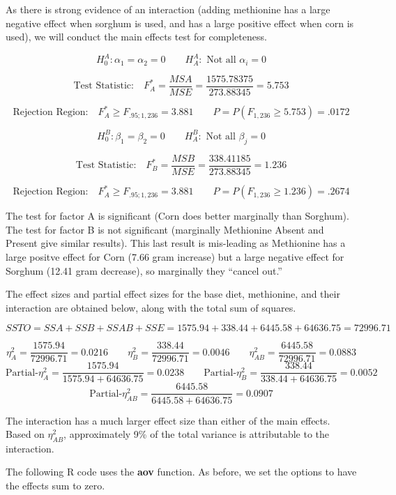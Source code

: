 \documentclass[
]{book}
\begin{document}
As there is strong evidence of an interaction (adding methionine has a
large negative effect when sorghum is used, and has a large positive
effect when corn is used), we will conduct the main effects test for
completeness.

\[
H_0^A: \alpha_1 =  \alpha_2=0 \qquad
H_A^A: \mbox { Not all } \alpha_i=0
\]

\[
\mbox{Test Statistic:} \quad F_{A}^*=
\frac{MSA}{MSE}=\frac{1575.78375}{273.88345}=5.753
\]

\[
\mbox{Rejection Region:} \quad F_{A}^* \ge F_{.95;1,236}=3.881
\qquad P=P\left(F_{1,236}\ge 5.753\right)=.0172
\]

\[
H_0^B: \beta_1 = \beta_2=0 \qquad
H_A^B: \mbox { Not all } \beta_j=0
\]

\[
\mbox{Test Statistic:} \quad F_{B}^*=\frac{MSB}{MSE}=\frac{338.41185}{273.88345}
=1.236
\]

\[
\mbox{Rejection Region:} \quad F_{A}^* \ge F_{.95;1,236}=3.881
\qquad P=P\left(F_{1,236}\ge 1.236\right)=.2674
\]

The test for factor A is significant (Corn does better marginally than
Sorghum). The test for factor B is not significant (marginally
Methionine Absent and Present give similar results). This last result is
mis-leading as Methionine has a large positve effect for Corn (7.66 gram
increase) but a large negative effect for Sorghum (12.41 gram decrease),
so marginally they ``cancel out.''

The effect sizes and partial effect sizes for the base diet, methionine,
and their interaction are obtained below, along with the total sum of
squares.

\[
SSTO=SSA+SSB+SSAB+SSE=1575.94+338.44+6445.58+64636.75=72996.71
\]

\[
\eta_A^2=\frac{1575.94}{72996.71}=0.0216 \qquad
\eta_B^2=\frac{338.44}{72996.71}=0.0046 \qquad
\eta_{AB}^2=\frac{6445.58}{72996.71}=0.0883 
\] \[
\mbox{Partial-} \eta_A^2=\frac{1575.94}{1575.94+64636.75}=0.0238 \qquad
\mbox{Partial-} \eta_B^2=\frac{338.44}{338.44+64636.75}=0.0052 
\] \[
\mbox{Partial-} \eta_{AB}^2=\frac{6445.58}{6445.58+64636.75}=0.0907
\]

The interaction has a much larger effect size than either of the main
effects. Based on \(\eta_{AB}^2\), approximately 9\% of the total
variance is attributable to the interaction.

The following R code uses the \textbf{aov} function. As before, we set
the options to have the effects sum to zero.
\end{document}
